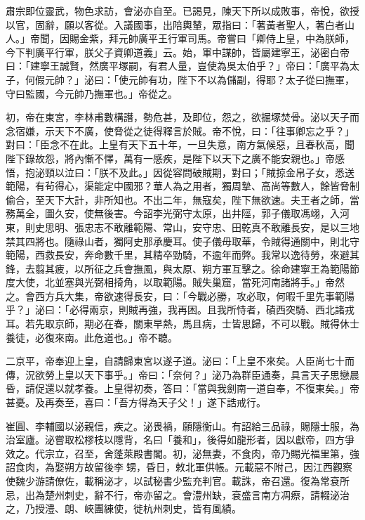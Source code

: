 \begin{pinyinscope}
 肅宗即位靈武，物色求訪，會泌亦自至。已謁見，陳天下所以成敗事，帝悅，欲授以官，固辭，願以客從。入議國事，出陪輿輦，眾指曰：「著黃者聖人，著白者山人。」帝聞，因賜金紫，拜元帥廣平王行軍司馬。帝嘗曰「卿侍上皇，中為朕師，今下判廣平行軍，朕父子資卿道義」云。始，軍中謀帥，皆屬建寧王，泌密白帝曰：「建寧王誠賢，然廣平塚嗣，有君人量，豈使為吳太伯乎？」帝曰：「廣平為太子，何假元帥？」泌曰：「使元帥有功，陛下不以為儲副，得耶？太子從曰撫軍，守曰監國，今元帥乃撫軍也。」帝從之。



 初，帝在東宮，李林甫數構譖，勢危甚，及即位，怨之，欲掘塚焚骨。泌以天子而念宿嫌，示天下不廣，使脅從之徒得釋言於賊。帝不悅，曰：「往事卿忘之乎？」對曰：「臣念不在此。上皇有天下五十年，一旦失意，南方氣候惡，且春秋高，聞陛下錄故怨，將內慚不懌，萬有一感疾，是陛下以天下之廣不能安親也。」帝感悟，抱泌頸以泣曰：「朕不及此。」因從容問破賊期，對曰；「賊掠金帛子女，悉送範陽，有茍得心，渠能定中國邪？華人為之用者，獨周摯、高尚等數人，餘皆脅制偷合，至天下大計，非所知也。不出二年，無寇矣，陛下無欲速。夫王者之師，當務萬全，圖久安，使無後害。今詔李光弼守太原，出井陘，郭子儀取馮翊，入河東，則史思明、張忠志不敢離範陽、常山，安守忠、田乾真不敢離長安，是以三地禁其四將也。隨祿山者，獨阿史那承慶耳。使子儀毋取華，令賊得通關中，則北守範陽，西救長安，奔命數千里，其精卒勁騎，不逾年而弊。我常以逸待勞，來避其鋒，去翦其疲，以所征之兵會撫風，與太原、朔方軍互擊之。徐命建寧王為範陽節度大使，北並塞與光弼相掎角，以取範陽。賊失巢窟，當死河南諸將手。」帝然之。會西方兵大集，帝欲速得長安，曰：「今戰必勝，攻必取，何暇千里先事範陽乎？」泌曰：「必得兩京，則賊再強，我再困。且我所恃者，磧西突騎、西北諸戎耳。若先取京師，期必在春，關東早熱，馬且病，士皆思歸，不可以戰。賊得休士養徒，必復來南。此危道也。」帝不聽。



 二京平，帝奉迎上皇，自請歸東宮以遂子道。泌曰：「上皇不來矣。人臣尚七十而傳，況欲勞上皇以天下事乎。」帝曰：「奈何？」泌乃為群臣通奏，具言天子思戀晨昏，請促還以就孝養。上皇得初奏，答曰：「當與我劍南一道自奉，不復東矣。」帝甚憂。及再奏至，喜曰：「吾方得為天子父！」遂下誥戒行。



 崔圓、李輔國以泌親信，疾之。泌畏禍，願隱衡山。有詔給三品祿，賜隱士服，為治室廬。泌嘗取松樛枝以隱背，名曰「養和」，後得如龍形者，因以獻帝，四方爭效之。代宗立，召至，舍蓬萊殿書閣。初，泌無妻，不食肉，帝乃賜光福里第，強詔食肉，為娶朔方故留後李甥，昏日，敕北軍供帳。元載惡不附己，因江西觀察使魏少游請僚佐，載稱泌才，以試秘書少監充判官。載誅，帝召還。復為常袞所忌，出為楚州刺史，辭不行，帝亦留之。會澧州缺，袞盛言南方凋瘵，請輟泌治之，乃授澧、朗、峽團練使，徙杭州刺史，皆有風績。




\end{pinyinscope}

